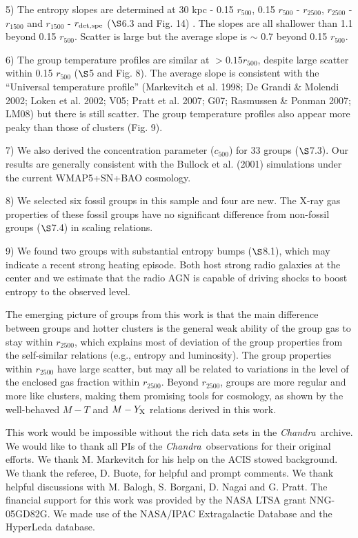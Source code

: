 \documentclass{aastex}
\def\chandra    {{\em Chandra}\/}
\begin{document}
5) The entropy slopes are determined at 30 kpc - 0.15 $r_{500}$, 0.15 $r_{500}$ -
$r_{2500}$, $r_{2500}$ - $r_{1500}$ and $r_{1500}$ - $r_{\rm det, spe}$ ($\S$6.3
and Fig. 14) . The slopes are all shallower than 1.1 beyond 0.15 $r_{500}$.
Scatter is large but the average slope is $\sim$ 0.7 beyond 0.15 $r_{500}$.

6) The group temperature profiles are similar at $> 0.15 r_{500}$, despite large
scatter within 0.15 $r_{500}$ ($\S$5 and Fig. 8). The average slope is consistent
with the ``Universal temperature profile'' (Markevitch et al. 1998; De Grandi \& Molendi
2002; Loken et al. 2002; V05; Pratt et al. 2007; G07; Rasmussen \& Ponman 2007; LM08)
but there is still scatter. The group temperature profiles also appear more peaky
than those of clusters (Fig. 9).

7) We also derived the concentration parameter ($c_{500}$) for 33 groups ($\S$7.3).
Our results are generally consistent with the Bullock et al. (2001) simulations under
the current WMAP5+SN+BAO cosmology.

8) We selected six fossil groups in this sample and four are new. The X-ray gas properties
of these fossil groups have no significant difference from non-fossil groups
($\S$7.4) in scaling relations.

9) We found two groups with substantial entropy bumps ($\S$8.1), which may indicate
a recent strong heating episode. Both host strong radio galaxies at the center and we
estimate that the radio AGN is capable of driving shocks to boost entropy to the
observed level.

The emerging picture of groups from this work is that the main difference
between groups and hotter clusters is the general weak ability of the group gas to stay
within $r_{2500}$, which explains most of deviation of the group properties
from the self-similar relations (e.g., entropy and luminosity).
The group properties within $r_{2500}$ have large scatter, but may all be
related to variations in the level of the enclosed gas fraction within $r_{2500}$.
Beyond $r_{2500}$, groups are more regular and more like clusters, making
them promising tools for cosmology, as shown by the well-behaved $M - T$
and $M - Y_{\rm X}$ relations derived in this work.

\acknowledgments

This work would be impossible without the rich data sets in the \chandra\ archive.
We would like to thank all PIs of the \chandra\ observations for their
original efforts. We thank M. Markevitch for his help on the ACIS stowed background.
We thank the referee, D. Buote, for helpful and prompt comments.
We thank helpful discussions with M. Balogh, S. Borgani, D. Nagai and G. Pratt.
The financial support for this work was provided by the NASA LTSA grant NNG-05GD82G.
We made use of the NASA/IPAC Extragalactic Database and the HyperLeda database.
\end{document}
